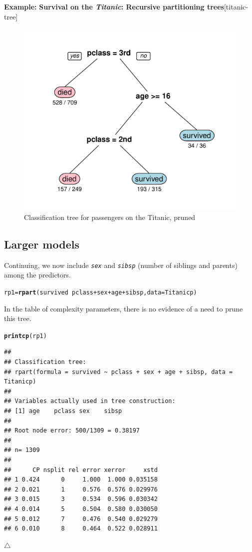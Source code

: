 \documentclass{article}
\makeatletter
\newcommand{\hlopt}[1]{\textcolor[rgb]{0,0,0}{#1}}%
\newcommand{\hlstd}[1]{\textcolor[rgb]{0.345,0.345,0.345}{#1}}%
\newcommand{\hlkwb}[1]{\textcolor[rgb]{0.69,0.353,0.396}{#1}}%
\newcommand{\hlkwc}[1]{\textcolor[rgb]{0.333,0.667,0.333}{#1}}%
\newcommand{\hlkwd}[1]{\textcolor[rgb]{0.737,0.353,0.396}{\textbf{#1}}}%
\newenvironment{kframe}{%
 \def\at@end@of@kframe{}%
 \ifinner\ifhmode%
  \def\at@end@of@kframe{\end{minipage}}%
  \begin{minipage}{\columnwidth}%
 \fi\fi%
 \def\FrameCommand##1{\hskip\@totalleftmargin \hskip-\fboxsep
 \colorbox{shadecolor}{##1}\hskip-\fboxsep
     \hskip-\linewidth \hskip-\@totalleftmargin \hskip\columnwidth}%
 \MakeFramed {\advance\hsize-\width
   \@totalleftmargin\z@ \linewidth\hsize
   \@setminipage}}%
 {\par\unskip\endMakeFramed%
 \at@end@of@kframe}
\newenvironment{knitrout}{}{} %
\newcommand{\var}[1]{\textit{\texttt{#1}}}
\newenvironment{Example}[2][unnamed-example]%
  {\medskip\noindent\textbf{\textsf{Example:}}
   \textbf{#2}\hfill [#1]\par\smallskip
  }
  {\hfill $\triangle$}
\makeatother
\begin{document}
\begin{Example}[titanic-tree]{Survival on the \emph{Titanic}: Recursive partitioning trees}
\begin{knitrout}
\begin{figure}[hbt!]
{\centering \includegraphics[width=0.6\linewidth]{figure/rp0-pruned-1} 

}

\caption[Classification tree for passengers on the Titanic, pruned]{Classification tree for passengers on the Titanic, pruned}\label{fig:rp0-pruned}
\end{figure}


\end{knitrout}

\subsection*{Larger models}
Continuing, we now include \var{sex} and \var{sibsp} 
(number of siblings and parents)
among the predictors.  
\begin{knitrout}
\color{fgcolor}\begin{kframe}
\begin{alltt}
\hlstd{rp1} \hlkwb{=} \hlkwd{rpart}\hlstd{(survived} \hlopt{~} \hlstd{pclass} \hlopt{+} \hlstd{sex} \hlopt{+} \hlstd{age} \hlopt{+} \hlstd{sibsp,} \hlkwc{data}\hlstd{=Titanicp)}
\end{alltt}
\end{kframe}
\end{knitrout}
In the table of complexity parameters, there is no evidence of a need to prune this
tree.
\begin{knitrout}
\color{fgcolor}\begin{kframe}
\begin{alltt}
\hlkwd{printcp}\hlstd{(rp1)}
\end{alltt}
\begin{verbatim}
## 
## Classification tree:
## rpart(formula = survived ~ pclass + sex + age + sibsp, data = Titanicp)
## 
## Variables actually used in tree construction:
## [1] age    pclass sex    sibsp 
## 
## Root node error: 500/1309 = 0.38197
## 
## n= 1309 
## 
##      CP nsplit rel error xerror     xstd
## 1 0.424      0     1.000  1.000 0.035158
## 2 0.021      1     0.576  0.576 0.029976
## 3 0.015      3     0.534  0.596 0.030342
## 4 0.014      5     0.504  0.580 0.030050
## 5 0.012      7     0.476  0.540 0.029279
## 6 0.010      8     0.464  0.522 0.028911
\end{verbatim}
\end{kframe}
\end{knitrout}


\end{Example}
\end{document}
